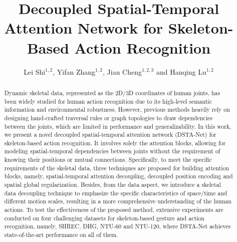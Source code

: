 \documentclass[runningheads]{llncs}
\begin{document}
\pagestyle{headings}
\mainmatter
\def\ECCVSubNumber{1018}  

\title{Decoupled Spatial-Temporal Attention Network for Skeleton-Based Action Recognition} 

\begin{comment}
\titlerunning{ECCV-20 submission ID \ECCVSubNumber} 
\authorrunning{ECCV-20 submission ID \ECCVSubNumber} 
\author{Anonymous ECCV submission}
\institute{Paper ID \ECCVSubNumber}
\end{comment}



\author{Lei Shi$^{1,2}$, Yifan Zhang$^{1,2}$, Jian Cheng$^{1,2,3}$ and Hanqing Lu$^{1,2}$}
\maketitle


\begin{abstract}
Dynamic skeletal data, represented as the 2D/3D coordinates of human joints, has been widely studied for human action recognition due to its high-level semantic information and environmental robustness. 
However, previous methods heavily rely on designing hand-crafted traversal rules or graph topologies to draw dependencies between the joints, which are limited in performance and generalizability. 
In this work, we present a novel decoupled spatial-temporal attention network (DSTA-Net) for skeleton-based action recognition.  
It involves solely the attention blocks, allowing for modeling spatial-temporal dependencies between joints without the requirement of knowing their positions or mutual connections. 
Specifically, to meet the specific requirements of the skeletal data, 
three techniques are proposed for building attention blocks,
namely, spatial-temporal attention decoupling, decoupled position encoding and spatial global regularization. 
Besides, from the data aspect, we introduce a skeletal data decoupling technique to emphasize the specific characteristics of space/time and different motion scales, 
resulting in a more comprehensive understanding of the human actions.
To test the effectiveness of the proposed method, extensive experiments are conducted on four challenging datasets for skeleton-based gesture and action recognition, namely, SHREC, DHG, NTU-60 and NTU-120, where DSTA-Net achieves state-of-the-art performance on all of them. 

\end{abstract}   
\end{document}
